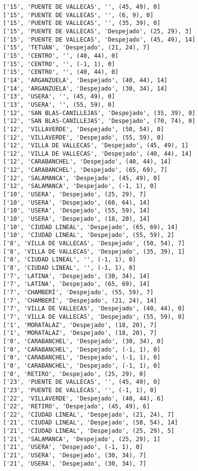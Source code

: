 \documentclass[11pt]{article}
\begin{document}
\begin{Verbatim}[commandchars=\\\{\}]
['15', 'PUENTE DE VALLECAS', '', (45, 49), 0]
['15', 'PUENTE DE VALLECAS', '', (6, 9), 0]
['15', 'PUENTE DE VALLECAS', '', (35, 39), 0]
['15', 'PUENTE DE VALLECAS', 'Despejado', (25, 29), 3]
['15', 'PUENTE DE VALLECAS', 'Despejado', (45, 49), 14]
['15', 'TETUÁN', 'Despejado', (21, 24), 7]
['15', 'CENTRO', '', (40, 44), 0]
['15', 'CENTRO', '', (-1, 1), 0]
['15', 'CENTRO', '', (40, 44), 0]
['14', 'ARGANZUELA', 'Despejado', (40, 44), 14]
['14', 'ARGANZUELA', 'Despejado', (30, 34), 14]
['13', 'USERA', '', (45, 49), 0]
['13', 'USERA', '', (55, 59), 0]
['12', 'SAN BLAS-CANILLEJAS', 'Despejado', (35, 39), 0]
['12', 'SAN BLAS-CANILLEJAS', 'Despejado', (70, 74), 0]
['12', 'VILLAVERDE', 'Despejado', (50, 54), 0]
['12', 'VILLAVERDE', 'Despejado', (55, 59), 0]
['12', 'VILLA DE VALLECAS', 'Despejado', (45, 49), 1]
['12', 'VILLA DE VALLECAS', 'Despejado', (40, 44), 14]
['12', 'CARABANCHEL', 'Despejado', (40, 44), 14]
['12', 'CARABANCHEL', 'Despejado', (65, 69), 7]
['12', 'SALAMANCA', 'Despejado', (45, 49), 0]
['12', 'SALAMANCA', 'Despejado', (-1, 1), 0]
['10', 'USERA', 'Despejado', (25, 29), 7]
['10', 'USERA', 'Despejado', (60, 64), 14]
['10', 'USERA', 'Despejado', (55, 59), 14]
['10', 'USERA', 'Despejado', (18, 20), 14]
['10', 'CIUDAD LINEAL', 'Despejado', (65, 69), 14]
['10', 'CIUDAD LINEAL', 'Despejado', (55, 59), 2]
['8', 'VILLA DE VALLECAS', 'Despejado', (50, 54), 7]
['8', 'VILLA DE VALLECAS', 'Despejado', (35, 39), 1]
['8', 'CIUDAD LINEAL', '', (-1, 1), 0]
['8', 'CIUDAD LINEAL', '', (-1, 1), 0]
['7', 'LATINA', 'Despejado', (30, 34), 14]
['7', 'LATINA', 'Despejado', (65, 69), 14]
['7', 'CHAMBERÍ', 'Despejado', (55, 59), 7]
['7', 'CHAMBERÍ', 'Despejado', (21, 24), 14]
['7', 'VILLA DE VALLECAS', 'Despejado', (40, 44), 0]
['7', 'VILLA DE VALLECAS', 'Despejado', (55, 59), 0]
['1', 'MORATALAZ', 'Despejado', (18, 20), 7]
['1', 'MORATALAZ', 'Despejado', (18, 20), 7]
['0', 'CARABANCHEL', 'Despejado', (30, 34), 0]
['0', 'CARABANCHEL', 'Despejado', (-1, 1), 0]
['0', 'CARABANCHEL', 'Despejado', (-1, 1), 0]
['0', 'CARABANCHEL', 'Despejado', (-1, 1), 0]
['0', 'RETIRO', 'Despejado', (25, 29), 0]
['23', 'PUENTE DE VALLECAS', '', (45, 49), 0]
['23', 'PUENTE DE VALLECAS', '', (-1, 1), 0]
['22', 'VILLAVERDE', 'Despejado', (40, 44), 6]
['22', 'RETIRO', 'Despejado', (45, 49), 6]
['22', 'CIUDAD LINEAL', 'Despejado', (21, 24), 7]
['21', 'CIUDAD LINEAL', 'Despejado', (50, 54), 14]
['21', 'CIUDAD LINEAL', 'Despejado', (25, 29), 5]
['21', 'SALAMANCA', 'Despejado', (25, 29), 1]
['21', 'USERA', 'Despejado', (-1, 1), 0]
['21', 'USERA', 'Despejado', (30, 34), 7]
['21', 'USERA', 'Despejado', (30, 34), 7]

\end{Verbatim}
\end{document}
